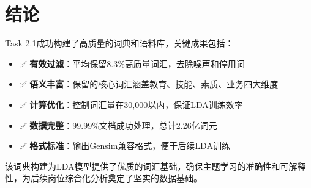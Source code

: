 \documentclass[11pt,a4paper]{article}
\begin{document}
\section{结论}

Task 2.1成功构建了高质量的词典和语料库，关键成果包括：

\begin{itemize}
    \item ✅ \textbf{有效过滤}：平均保留8.3\%高质量词汇，去除噪声和停用词
    \item ✅ \textbf{语义丰富}：保留的核心词汇涵盖教育、技能、素质、业务四大维度
    \item ✅ \textbf{计算优化}：控制词汇量在30,000以内，保证LDA训练效率
    \item ✅ \textbf{数据完整}：99.99\%文档成功处理，总计2.26亿词元
    \item ✅ \textbf{格式标准}：输出Gensim兼容格式，便于后续LDA训练
\end{itemize}

该词典构建为LDA模型提供了优质的词汇基础，确保主题学习的准确性和可解释性，为后续岗位综合化分析奠定了坚实的数据基础。
\end{document}
